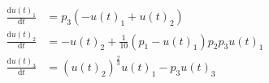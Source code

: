 \begin{align}
\frac{\mathrm{d} u\left( t \right)_{1}}{\mathrm{d}t} &= p_{3} \left(  - u\left( t \right)_{1} + u\left( t \right)_{2} \right) \\
\frac{\mathrm{d} u\left( t \right)_{2}}{\mathrm{d}t} &=  - u\left( t \right)_{2} + \frac{1}{10} \left( p_{1} - u\left( t \right)_{1} \right) p_{2} p_{3} u\left( t \right)_{1} \\
\frac{\mathrm{d} u\left( t \right)_{3}}{\mathrm{d}t} &= \left( u\left( t \right)_{2} \right)^{\frac{2}{3}} u\left( t \right)_{1} - p_{3} u\left( t \right)_{3}
\end{align}
